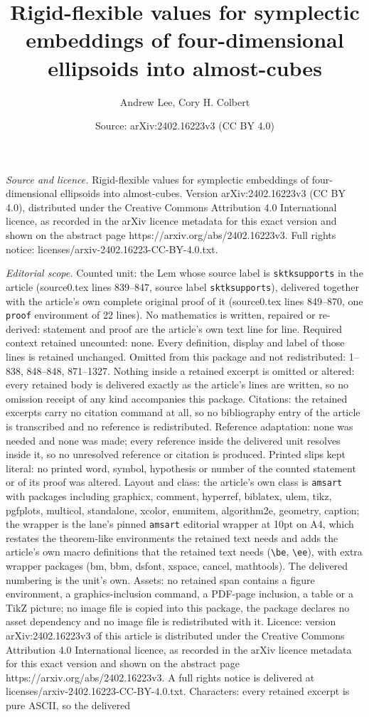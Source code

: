 \documentclass[10pt,a4paper]{amsart}
\title[Rigid-flexible values for symplectic embeddings of four-dime]{Rigid-flexible values for symplectic embeddings of four-dimensional ellipsoids into almost-cubes}
\author{Andrew Lee, Cory H. Colbert}
\date{Source: arXiv:2402.16223v3 (CC BY 4.0)}
\begin{document}
\maketitle

\noindent\emph{Source and licence.} Rigid-flexible values for symplectic embeddings of four-dimensional ellipsoids into almost-cubes. Version arXiv:2402.16223v3 (CC BY 4.0), distributed under the Creative Commons Attribution 4.0 International licence, as recorded in the arXiv licence metadata for this exact version and shown on the abstract page https://arxiv.org/abs/2402.16223v3. Full rights notice: licenses/arxiv-2402.16223-CC-BY-4.0.txt.\par\smallskip

\noindent\textit{Editorial scope.} Counted unit: the Lem whose source label is \texttt{sktksupports} in the article (source0.tex lines 839--847, source label \texttt{sktksupports}), delivered together with the article's own complete original proof of it (source0.tex lines 849--870, one \texttt{proof} environment of 22 lines). No mathematics is written, repaired or re-derived: statement and proof are the article's own text line for line. Required context retained uncounted: none. Every definition, display and label of those lines is retained unchanged. Omitted from this package and not redistributed: 1--838, 848--848, 871--1327. Nothing inside a retained excerpt is omitted or altered: every retained body is delivered exactly as the article's lines are written, so no omission receipt of any kind accompanies this package. Citations: the retained excerpts carry no citation command at all, so no bibliography entry of the article is transcribed and no reference is redistributed. Reference adaptation: none was needed and none was made; every reference inside the delivered unit resolves inside it, so no unresolved reference or citation is produced. Printed slips kept literal: no printed word, symbol, hypothesis or number of the counted statement or of its proof was altered. Layout and class: the article's own class is \texttt{amsart} with packages including graphicx, comment, hyperref, biblatex, ulem, tikz, pgfplots, multicol, standalone, xcolor, enumitem, algorithm2e, geometry, caption; the wrapper is the lane's pinned \texttt{amsart} editorial wrapper at 10pt on A4, which restates the theorem-like environments the retained text needs and adds the article's own macro definitions that the retained text needs (\texttt{\textbackslash be}, \texttt{\textbackslash ee}), with extra wrapper packages (bm, bbm, dsfont, xspace, cancel, mathtools). The delivered numbering is the unit's own. Assets: no retained span contains a figure environment, a graphics-inclusion command, a PDF-page inclusion, a table or a TikZ picture; no image file is copied into this package, the package declares no asset dependency and no image file is redistributed with it. Licence: version arXiv:2402.16223v3 of this article is distributed under the Creative Commons Attribution 4.0 International licence, as recorded in the arXiv licence metadata for this exact version and shown on the abstract page https://arxiv.org/abs/2402.16223v3. A full rights notice is delivered at licenses/arxiv-2402.16223-CC-BY-4.0.txt. Characters: every retained excerpt is pure ASCII, so the delivered 
\end{document}
